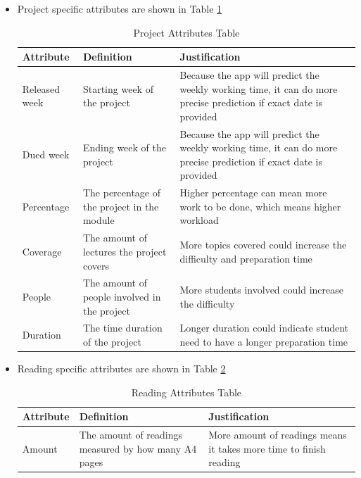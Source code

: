 \documentclass[fyp]{socreport}
\begin{document}
\begin{itemize}
	\item Project specific attributes are shown in Table {\ref{project-attribute}}
	\begin{table}[]
	\centering
	\begin{tabular}{|p{}|p{}|p{}|}
	\hline
		\rowcolor[HTML]{C0C0C0}
	  \textbf{Attribute} & \textbf{Definition} & \textbf{Justification} \\
	\hline
	Released week & Starting week of the project & Because the app will predict the weekly working time, it can do more precise prediction if exact date is provided \\
	\hline
	Dued week & Ending week of the project & Because the app will predict the weekly working time, it can do more precise prediction if exact date is provided \\
	\hline
	Percentage & The percentage of the project in the module & Higher percentage can mean more work to be done, which means higher workload \\
	\hline
	Coverage & The amount of lectures the project covers & More topics covered could increase the difficulty and preparation time \\
	\hline
	People & The amount of people involved in the project & More students involved could increase the difficulty \\
	\hline
	Duration & The time duration of the project & Longer duration could indicate student need to have a longer preparation time \\
	\hline
	\end{tabular}
	\caption{Project Attributes Table}
	\label{project-attribute}
	\end{table}

	\item Reading specific attributes are shown in Table {\ref{reading-attribute}}
	\begin{table}[]
	\centering
	\begin{tabular}{|p{}|p{}|p{}|}
	\hline
		\rowcolor[HTML]{C0C0C0}
	  \textbf{Attribute} & \textbf{Definition} & \textbf{Justification} \\
	\hline
	Amount & The amount of readings measured by how many A4 pages & More amount of readings means it takes more time to finish reading \\
	\hline
	\end{tabular}
	\caption{Reading Attributes Table}
	\label{reading-attribute}
	\end{table}


\end{itemize}
\end{document}
